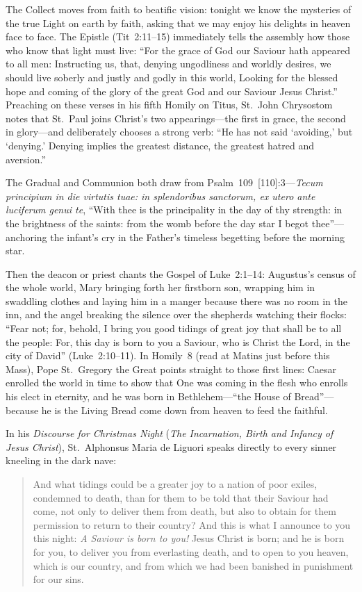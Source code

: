 The Collect moves from faith to beatific vision: tonight we know the mysteries
of the true Light on earth by faith, asking that we may enjoy his delights in
heaven face to face. The Epistle (Tit~2:11--15) immediately tells the assembly
how those who know that light must live: ``For the grace of God our Saviour hath
appeared to all men: Instructing us, that, denying ungodliness and worldly
desires, we should live soberly and justly and godly in this world, Looking for
the blessed hope and coming of the glory of the great God and our Saviour Jesus
Christ.'' Preaching on these verses in his fifth Homily on Titus, St.~John
Chrysostom notes that St.~Paul joins Christ's two appearings---the first in
grace, the second in glory---and deliberately chooses a strong verb: ``He has
not said `avoiding,' but `denying.' Denying implies the greatest distance, the
greatest hatred and aversion.''

The Gradual and Communion both draw from Psalm~109~[110]:3---\textit{Tecum
principium in die virtutis tuae: in splendoribus sanctorum, ex utero ante
luciferum genui te}, ``With thee is the principality in the day of thy strength:
in the brightness of the saints: from the womb before the day star I begot
thee''---anchoring the infant's cry in the Father's timeless begetting before
the morning star.

Then the deacon or priest chants the Gospel of Luke~2:1--14: Augustus's census
of the whole world, Mary bringing forth her firstborn son, wrapping him in
swaddling clothes and laying him in a manger because there was no room in the
inn, and the angel breaking the silence over the shepherds watching their
flocks: ``Fear not; for, behold, I bring you good tidings of great joy that
shall be to all the people: For, this day is born to you a Saviour, who is
Christ the Lord, in the city of David'' (Luke~2:10--11). In Homily~8 (read at
Matins just before this Mass), Pope St.~Gregory the Great points straight to
those first lines: Caesar enrolled the world in time to show that One was coming
in the flesh who enrolls his elect in eternity, and he was born in
Bethlehem---``the House of Bread''---because he is the Living Bread come down
from heaven to feed the faithful.

In his \textit{Discourse for Christmas Night} (\textit{The Incarnation, Birth
and Infancy of Jesus Christ}), St.~Alphonsus Maria de Liguori speaks directly to
every sinner kneeling in the dark nave:

\begin{quote}
And what tidings could be a greater joy to a nation of poor exiles, condemned to
death, than for them to be told that their Saviour had come, not only to deliver
them from death, but also to obtain for them permission to return to their
country? And this is what I announce to you this night: \textit{A Saviour is
born to you!} Jesus Christ is born; and he is born for you, to deliver you from
everlasting death, and to open to you heaven, which is our country, and from
which we had been banished in punishment for our sins.
\end{quote}

